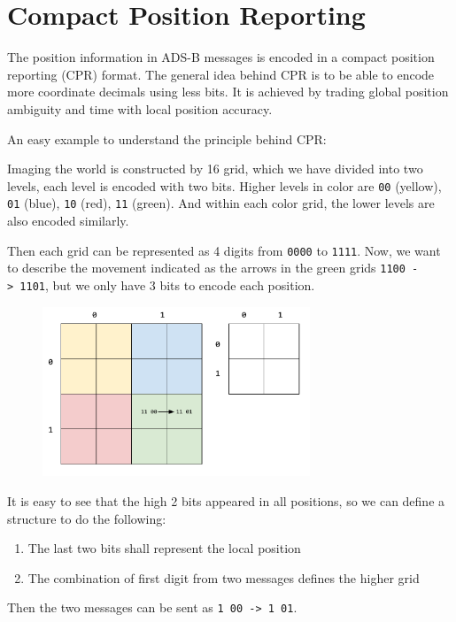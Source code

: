 \section{Compact Position Reporting}\label{compact-position-reporting}

The position information in ADS-B messages is encoded in a compact position reporting (CPR) format. The general idea behind CPR is to be able to encode more coordinate decimals using less bits. It is achieved by trading global position ambiguity and time with local position accuracy.

An easy example to understand the principle behind CPR:

Imaging the world is constructed by 16 grid, which we have divided into two levels, each level is encoded with two bits. Higher levels in color are \texttt{00} (yellow), \texttt{01} (blue), \texttt{10} (red), \texttt{11} (green). And within each color grid, the lower levels are also encoded similarly.

Then each grid can be represented as 4 digits from \texttt{0000} to \texttt{1111}. Now, we want to describe the movement indicated as the arrows in the green grids \texttt{1100\ -\textgreater{}\ 1101}, but we only have 3 bits to encode each position.

\begin{figure}
  \center
  \includegraphics[width=8cm]{images/illustration-cpr-1.pdf}
\end{figure}

It is easy to see that the high 2 bits appeared in all positions, so we can define a structure to do the following:

\begin{enumerate}
  \item The last two bits shall represent the local position
  \item The combination of first digit from two messages defines the higher grid
\end{enumerate}

Then the two messages can be sent as \texttt{1\ 00\ -\textgreater{}\ 1\ 01}.

